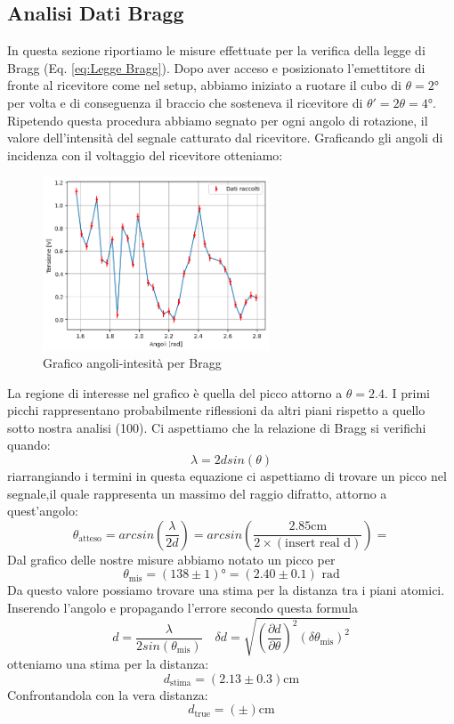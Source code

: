 \documentclass[letterpaper,12pt]{article}
\begin{document}
\newpage
\subsection{Analisi Dati Bragg}
In questa sezione riportiamo le misure effettuate per la verifica della legge di Bragg (Eq. \ref{eq:Legge Bragg}). Dopo aver acceso e posizionato l'emettitore di fronte al ricevitore come nel setup, abbiamo iniziato a ruotare il cubo di $\theta = 2\text{°}$ per volta e di conseguenza il braccio che sosteneva il ricevitore di $\theta' = 2\theta = 4\text{°}$.
Ripetendo questa procedura abbiamo segnato per ogni angolo di rotazione, il valore dell'intensità del segnale catturato dal ricevitore.
Graficando gli angoli di incidenza con il voltaggio del ricevitore otteniamo: 
\begin{figure}[h!]
	\centering
	\includegraphics[width = 0.6\textwidth]{Grafico1_bragg.png}
	\caption{Grafico angoli-intesità per Bragg}
	\label{fig:GraficoBragg}
\end{figure}

La regione di interesse nel grafico è quella del picco attorno a $\theta=2.4$. I primi picchi rappresentano probabilmente riflessioni da altri piani rispetto a quello sotto nostra analisi (100).
Ci aspettiamo che la relazione di Bragg si verifichi quando:
$$ \lambda = 2dsin(\theta) $$
riarrangiando i termini in questa equazione ci aspettiamo di trovare un picco nel segnale,il quale rappresenta un massimo del raggio difratto, attorno a quest'angolo:
$$ \theta_\text{atteso} = arcsin(\frac{\lambda}{2d}) = arcsin(\frac{2.85\text{cm}}{2\times(\text{insert real d})}) =  $$ 
Dal grafico delle nostre misure abbiamo notato un picco per $$\theta_\text{mis} = (138 \pm1)\text{°} = (2.40 \pm0.1)\text{ rad}$$
Da questo valore possiamo trovare una stima per la distanza tra i piani atomici.
Inserendo l'angolo e propagando l'errore secondo questa formula 
$$ d = \frac{\lambda}{2sin(\theta_\text{mis})} \quad \delta d = \sqrt{\left( \frac{\partial d}{\partial \theta} \right)^2 (\delta \theta_\text{mis})^2} $$ 
otteniamo una stima per la distanza: $$ d_\text{stima} = (2.13 \pm0.3) \text{cm} $$ 	
Confrontandola con la vera distanza: $$ d_\text{true} = ( \pm) \text{cm} $$ 
\end{document}
